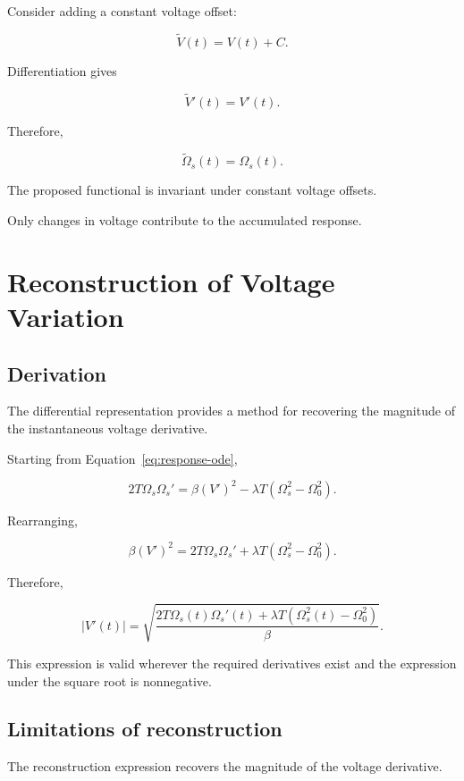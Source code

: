 \documentclass[12pt]{article}
\theoremstyle{definition}
\theoremstyle{remark}
\begin{document}
Consider adding a constant voltage offset:

\[
\widetilde{V}(t)=V(t)+C.
\]

Differentiation gives

\[
\widetilde{V}'(t)=V'(t).
\]

Therefore,

\begin{equation}
\widetilde{\Omega}_s(t)=\Omega_s(t).
\end{equation}

The proposed functional is invariant under
constant voltage offsets.

Only changes in voltage contribute to
the accumulated response.

\section{Reconstruction of Voltage Variation}

\subsection{Derivation}

The differential representation provides
a method for recovering the magnitude of
the instantaneous voltage derivative.

Starting from Equation~\eqref{eq:response-ode},

\[
2T\Omega_s\Omega_s'
=
\beta(V')^2
-
\lambda T(\Omega_s^2-\Omega_0^2).
\]

Rearranging,

\[
\beta(V')^2
=
2T\Omega_s\Omega_s'
+
\lambda T(\Omega_s^2-\Omega_0^2).
\]

Therefore,

\begin{equation}
|V'(t)|=
\sqrt{
\frac{
2T\Omega_s(t)\Omega_s'(t)
+
\lambda T\left(\Omega_s^2(t)-\Omega_0^2\right)
}{\beta}
}.
\label{eq:reconstruction}
\end{equation}

This expression is valid wherever the
required derivatives exist and the expression
under the square root is nonnegative.

\subsection{Limitations of reconstruction}

The reconstruction expression recovers
the magnitude of the voltage derivative.
\end{document}
